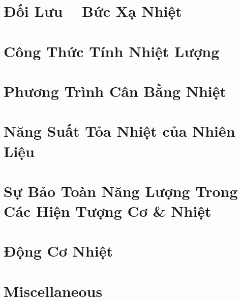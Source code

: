 \documentclass{article}
\numberwithin{equation}{section}
\begin{document}

\section{Đối Lưu -- Bức Xạ Nhiệt}


\section{Công Thức Tính Nhiệt Lượng}


\section{Phương Trình Cân Bằng Nhiệt}


\section{Năng Suất Tỏa Nhiệt của Nhiên Liệu}


\section{Sự Bảo Toàn Năng Lượng Trong Các Hiện Tượng Cơ \& Nhiệt}


\section{Động Cơ Nhiệt}


\section{Miscellaneous}


\printbibliography[heading=bibintoc]
	
\end{document}
